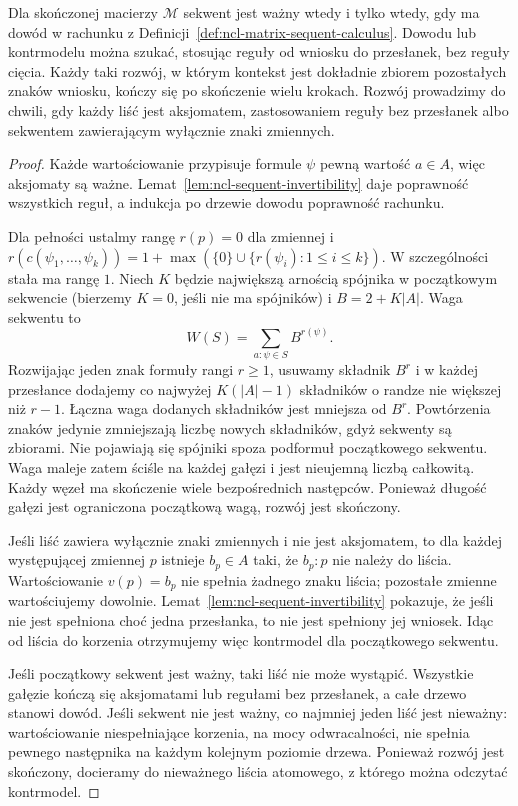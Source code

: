 \begin{twierdzenie}
\label{thm:ncl-sequent-sound-complete}
Dla skończonej macierzy $\mathcal M$ sekwent jest
ważny wtedy i tylko wtedy, gdy ma dowód w rachunku
z Definicji~\ref{def:ncl-matrix-sequent-calculus}.
Dowodu lub kontrmodelu można szukać, stosując
reguły od wniosku do przesłanek, bez reguły cięcia.
Każdy taki rozwój, w którym kontekst jest dokładnie
zbiorem pozostałych znaków wniosku, kończy się po
skończenie wielu krokach. Rozwój prowadzimy do chwili,
gdy każdy liść jest aksjomatem, zastosowaniem reguły
bez przesłanek albo sekwentem zawierającym wyłącznie
znaki zmiennych.
\end{twierdzenie}
\begin{proof}
Każde wartościowanie przypisuje formule $\psi$
pewną wartość $a\in A$, więc aksjomaty są ważne.
Lemat~\ref{lem:ncl-sequent-invertibility} daje
poprawność wszystkich reguł, a indukcja po drzewie
dowodu poprawność rachunku.

Dla pełności ustalmy rangę $r(p)=0$ dla zmiennej
i $r(c(\psi_1,\ldots,\psi_k))=
1+\max(\{0\}\cup\{r(\psi_i):1\leq i\leq k\})$.
W szczególności stała ma rangę $1$.
Niech $K$ będzie największą arnością spójnika
w początkowym sekwencie (bierzemy $K=0$, jeśli
nie ma spójników) i $B=2+K|A|$.
Waga sekwentu to
\[
 W(S)=\sum_{a:\psi\in S} B^{r(\psi)}.
\]
Rozwijając jeden znak formuły rangi $r\geq1$,
usuwamy składnik $B^r$ i w każdej przesłance
dodajemy co najwyżej $K(|A|-1)$ składników
o randze nie większej niż $r-1$.
Łączna waga dodanych składników jest mniejsza
od $B^r$. Powtórzenia znaków jedynie zmniejszają
liczbę nowych składników, gdyż sekwenty są zbiorami.
Nie pojawiają się spójniki spoza podformuł
początkowego sekwentu. Waga maleje zatem
ściśle na każdej gałęzi i jest nieujemną liczbą
całkowitą. Każdy węzeł ma skończenie wiele
bezpośrednich następców. Ponieważ długość gałęzi
jest ograniczona początkową wagą, rozwój jest skończony.

Jeśli liść zawiera wyłącznie znaki zmiennych i nie
jest aksjomatem, to dla każdej występującej zmiennej
$p$ istnieje $b_p\in A$ taki, że $b_p:p$ nie należy
do liścia. Wartościowanie $v(p)=b_p$ nie spełnia
żadnego znaku liścia; pozostałe zmienne wartościujemy
dowolnie. Lemat~\ref{lem:ncl-sequent-invertibility}
pokazuje, że jeśli nie jest spełniona choć jedna
przesłanka, to nie jest spełniony jej wniosek.
Idąc od liścia do korzenia otrzymujemy więc
kontrmodel dla początkowego sekwentu.

Jeśli początkowy sekwent jest ważny, taki liść
nie może wystąpić. Wszystkie gałęzie kończą się
aksjomatami lub regułami bez przesłanek, a całe
drzewo stanowi dowód. Jeśli sekwent nie jest ważny,
co najmniej jeden liść jest nieważny: wartościowanie
niespełniające korzenia, na mocy odwracalności,
nie spełnia pewnego następnika na każdym kolejnym
poziomie drzewa. Ponieważ rozwój jest skończony,
docieramy do nieważnego liścia atomowego, z którego
można odczytać kontrmodel.
\end{proof}

